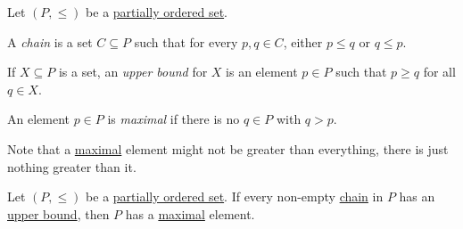 \begin{definition*}
	Let \((P, \leq )\) be a \href{https://en.wikipedia.org/wiki/Partially_ordered_set}{partially ordered set}.
	\begin{definition}[Chain]\label{def:chain}
		A \emph{chain} is a set \(C \subseteq P\) such that for every \(p, q\in C\), either \(p \leq q\) or \(q \leq p\).
	\end{definition}
	\begin{definition}\label{def:upper-bound}
		If \(X \subseteq P\) is a set, an \emph{upper bound} for \(X\) is an element \(p\in P\) such that \(p \geq q\) for all \(q\in X\).
	\end{definition}
	\begin{definition}[Maximal]\label{def:POS-maximal}
		An element \(p\in P\) is \emph{maximal} if there is no \(q\in P\) with \(q > p\).
	\end{definition}
\end{definition*}

\begin{note}
	Note that a \hyperref[def:POS-maximal]{maximal} element might not be greater than everything, there is just nothing greater than it.
\end{note}

\begin{theorem}\label{thm:Zorn}
	Let \((P, \leq )\) be a \href{https://en.wikipedia.org/wiki/Partially_ordered_set}{partially ordered set}. If every non-empty \hyperref[def:chain]{chain} in \(P\) has an \hyperref[def:upper-bound]{upper bound}, then \(P\) has a \hyperref[def:POS-maximal]{maximal} element.
\end{theorem}

